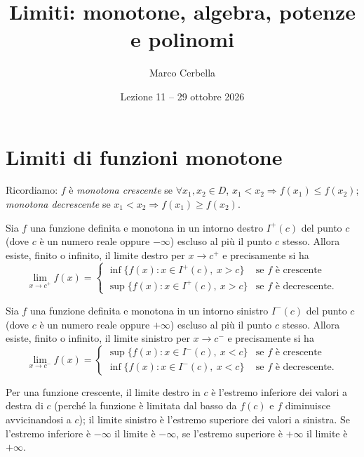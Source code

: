 \documentclass[11pt,a4paper]{article}
\title{Limiti: monotone, algebra, potenze e polinomi}
\author{Marco Cerbella}
\date{Lezione 11 -- 29 ottobre 2026}
\begin{document}
\maketitle

\section{Limiti di funzioni monotone}

Ricordiamo: $f$ è \emph{monotona crescente} se $\forall x_1, x_2 \in D$, $x_1 < x_2 \Rightarrow f(x_1) \le f(x_2)$; \emph{monotona decrescente} se $x_1 < x_2 \Rightarrow f(x_1) \ge f(x_2)$.

\begin{proposizione}
Sia $f$ una funzione definita e monotona in un intorno destro $I^+(c)$ del punto $c$ (dove $c$ è un numero reale oppure $-\infty$) escluso al più il punto $c$ stesso. Allora esiste, finito o infinito, il limite destro per $x \to c^+$ e precisamente si ha
\[
\lim_{x\to c^+} f(x) = \begin{cases} \inf\{f(x) : x \in I^+(c),\ x > c\} & \text{se } f \text{ è crescente} \\ \sup\{f(x) : x \in I^+(c),\ x > c\} & \text{se } f \text{ è decrescente.} \end{cases}
\]
\end{proposizione}

\begin{proposizione}
Sia $f$ una funzione definita e monotona in un intorno sinistro $I^-(c)$ del punto $c$ (dove $c$ è un numero reale oppure $+\infty$) escluso al più il punto $c$ stesso. Allora esiste, finito o infinito, il limite sinistro per $x \to c^-$ e precisamente si ha
\[
\lim_{x\to c^-} f(x) = \begin{cases} \sup\{f(x) : x \in I^-(c),\ x < c\} & \text{se } f \text{ è crescente} \\ \inf\{f(x) : x \in I^-(c),\ x < c\} & \text{se } f \text{ è decrescente.} \end{cases}
\]
\end{proposizione}

Per una funzione crescente, il limite destro in $c$ è l'estremo inferiore dei valori a destra di $c$ (perché la funzione è limitata dal basso da $f(c)$ e $f$ diminuisce avvicinandosi a $c$); il limite sinistro è l'estremo superiore dei valori a sinistra. Se l'estremo inferiore è $-\infty$ il limite è $-\infty$, se l'estremo superiore è $+\infty$ il limite è $+\infty$.
\end{document}
